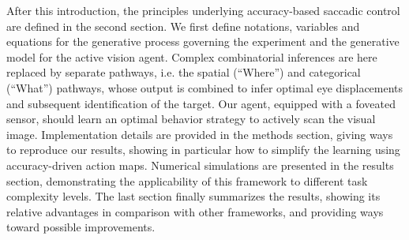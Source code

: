 After this introduction, the principles underlying accuracy-based saccadic control are defined in the second section. We first define notations, variables and equations for the generative process governing the experiment and the generative model for the active vision agent.
Complex combinatorial inferences are here replaced by separate pathways, i.e. the spatial (``Where'') and categorical (``What'') pathways, whose output is combined to infer optimal eye displacements and subsequent identification of the target. Our agent, equipped with a foveated sensor, should learn an optimal behavior strategy to actively scan the visual image. Implementation details are provided in the methods section, giving ways to reproduce our results,  showing in particular how to simplify the learning using accuracy-driven action maps. Numerical simulations are presented in the results section, demonstrating the applicability of this framework to different task complexity levels. %
The last section finally summarizes the results, showing its relative advantages in comparison with other frameworks, and providing ways toward possible improvements.



